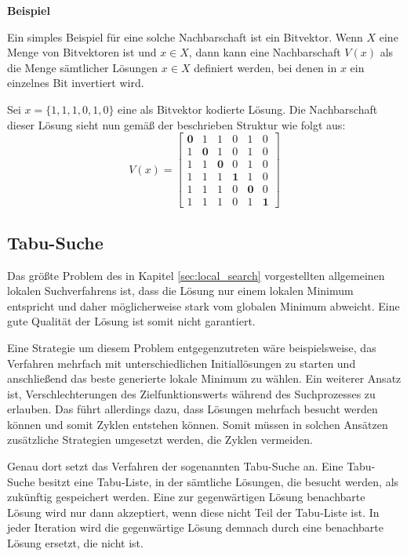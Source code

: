 \textbf{Beispiel}

Ein simples Beispiel für eine solche Nachbarschaft ist ein Bitvektor. Wenn $X$ eine Menge
von Bitvektoren ist und $x \in X$, dann kann eine Nachbarschaft $V(x)$ als die Menge
sämtlicher Lösungen $x \in X$ definiert werden, bei denen in $x$ ein einzelnes Bit invertiert wird. \cite{Pirlot1996}

Sei $x = \{1, 1, 1, 0, 1, 0\}$ eine als Bitvektor kodierte Lösung.
Die Nachbarschaft dieser Lösung sieht nun gemäß der beschrieben Struktur wie folgt aus:
\[
V(x) =
  \begin{bmatrix}
    \boldsymbol{0} & 1 & 1 & 0 & 1 & 0 \\
    1 & \boldsymbol{0} & 1 & 0 & 1 & 0 \\
    1 & 1 & \boldsymbol{0} & 0 & 1 & 0 \\
    1 & 1 & 1 & \boldsymbol{1} & 1 & 0 \\
    1 & 1 & 1 & 0 & \boldsymbol{0} & 0 \\
    1 & 1 & 1 & 0 & 1 & \boldsymbol{1}
  \end{bmatrix}
\]

\pagebreak

\subsection{Tabu-Suche}
\label{sec:tabu_seach}

Das größte Problem des in Kapitel \ref{sec:local_search} vorgestellten allgemeinen lokalen Suchverfahrens
ist, dass die Lösung nur einem lokalen Minimum entspricht und daher möglicherweise stark vom globalen
Minimum abweicht. Eine gute Qualität der Lösung ist somit nicht garantiert.

Eine Strategie um diesem Problem entgegenzutreten wäre beispielsweise, das Verfahren mehrfach mit unterschiedlichen
Initiallösungen zu starten und anschließend das beste generierte lokale Minimum zu wählen.
Ein weiterer Ansatz ist, Verschlechterungen des Zielfunktionswerts während des Suchprozesses zu erlauben.
Das führt allerdings dazu, dass Lösungen mehrfach besucht werden können und somit Zyklen entstehen können.
Somit müssen in solchen Ansätzen zusätzliche Strategien umgesetzt werden, die Zyklen vermeiden. \cite{Brucker2006}

Genau dort setzt das Verfahren der sogenannten Tabu-Suche an. Eine Tabu-Suche besitzt eine Tabu-Liste,
in der sämtliche Lösungen, die besucht werden, als zukünftig  gespeichert werden.
Eine zur gegenwärtigen Lösung benachbarte Lösung wird nur dann akzeptiert, wenn diese nicht Teil der Tabu-Liste ist.
In jeder Iteration wird die gegenwärtige Lösung demnach durch eine benachbarte Lösung ersetzt, die nicht  ist.

